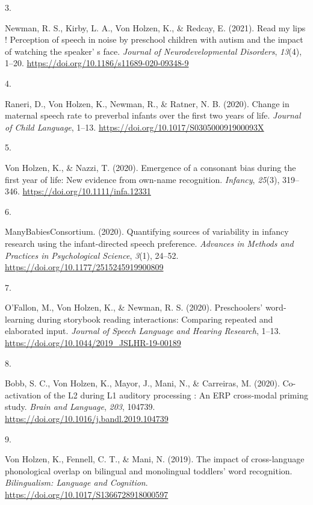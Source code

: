 \documentclass[10pt,a4paper,]{article}
\newlength{\cslhangindent}
\newlength{\csllabelwidth}
\newcommand{\CSLLeftMargin}[1]{\parbox[t]{\csllabelwidth}{\hfill #1~}}
\newcommand{\CSLRightInline}[1]{\parbox[t]{\linewidth - \cslhangindent - \csllabelwidth}{#1}\vspace{0.8ex}}
\begin{document}
\leavevmode{}%
\CSLLeftMargin{3. }%
\CSLRightInline{Newman, R. S., Kirby, L. A., Von Holzen, K., \& Redcay,
E. (2021). Read my lips ! Perception of speech in noise by preschool
children with autism and the impact of watching the speaker' s face.
\emph{Journal of Neurodevelopmental Disorders}, \emph{13}(4), 1--20.
\url{https://doi.org/10.1186/s11689-020-09348-9}}

\leavevmode{}%
\CSLLeftMargin{4. }%
\CSLRightInline{Raneri, D., Von Holzen, K., Newman, R., \& Ratner, N. B.
(2020). Change in maternal speech rate to preverbal infants over the
first two years of life. \emph{Journal of Child Language}, 1--13.
\url{https://doi.org/10.1017/S030500091900093X}}

\leavevmode{}%
\CSLLeftMargin{5. }%
\CSLRightInline{Von Holzen, K., \& Nazzi, T. (2020). Emergence of a
consonant bias during the first year of life: New evidence from own-name
recognition. \emph{Infancy}, \emph{25}(3), 319--346.
\url{https://doi.org/10.1111/infa.12331}}

\leavevmode{}%
\CSLLeftMargin{6. }%
\CSLRightInline{ManyBabiesConsortium. (2020). Quantifying sources of
variability in infancy research using the infant-directed speech
preference. \emph{Advances in Methods and Practices in Psychological
Science}, \emph{3}(1), 24--52.
\url{https://doi.org/10.1177/2515245919900809}}

\leavevmode{}%
\CSLLeftMargin{7. }%
\CSLRightInline{O'Fallon, M., Von Holzen, K., \& Newman, R. S. (2020).
Preschoolers' word-learning during storybook reading interactions:
Comparing repeated and elaborated input. \emph{Journal of Speech
Language and Hearing Research}, 1--13.
\url{https://doi.org/10.1044/2019_JSLHR-19-00189}}

\leavevmode{}%
\CSLLeftMargin{8. }%
\CSLRightInline{Bobb, S. C., Von Holzen, K., Mayor, J., Mani, N., \&
Carreiras, M. (2020). Co-activation of the L2 during L1 auditory
processing : An ERP cross-modal priming study. \emph{Brain and
Language}, \emph{203}, 104739.
\url{https://doi.org/10.1016/j.bandl.2019.104739}}

\leavevmode{}%
\CSLLeftMargin{9. }%
\CSLRightInline{Von Holzen, K., Fennell, C. T., \& Mani, N. (2019). The
impact of cross-language phonological overlap on bilingual and
monolingual toddlers' word recognition. \emph{Bilingualism: Language and
Cognition}. \url{https://doi.org/10.1017/S1366728918000597}}
\end{document}
